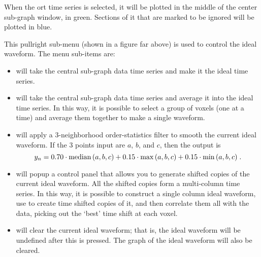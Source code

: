 \begin{description}
                    When the ort time series is selected, it will be plotted
                    in the middle of the center sub-graph window, in green.
                    Sections of it that are marked to be ignored will
                    be plotted in blue.

    This pullright sub-menu (shown in a figure far above)
                      is used to control the ideal waveform.
                      The menu sub-items are:
   \begin{itemize}
      \item {} will take the central sub-graph data time
             series and make it the ideal time series.

      \item {} will take the central sub-graph data time
             series and average it into the ideal time series.  In this way,
             it is possible to select a group of voxels (one at a time)
             and average them together to make a single waveform.

      \item {} will apply a 3-neighborhood order-statistics
             filter to smooth the current ideal waveform.  If the 3 points
             input are $a$, $b$, and $c$, then
             the output is
             \begin{displaymath}
                y_n = 0.70 \cdot {\rm median}\,(a,b,c)
                    + 0.15 \cdot {\rm max}\,(a,b,c)
                    + 0.15 \cdot {\rm min}\,(a,b,c) \;.
             \end{displaymath}

      \item {} will popup a control panel that allows you
            to generate shifted copies of the current ideal waveform.
            All the shifted copies form a multi-column time series.
            In this way, it is possible to construct a single column ideal
            waveform, use \afnit to create time shifted copies of it,
            and then correlate them all with the data, picking out the
            `best' time shift at each voxel.

      \item {} will clear the current ideal waveform; that is,
             the ideal waveform will be undefined after this is pressed.
             The graph of the ideal waveform will also be cleared.


\end{itemize}
\end{description}

